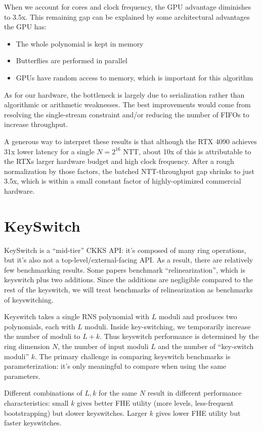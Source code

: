\documentclass{article}
\begin{document}
When we account for cores and clock frequency, the GPU advantage diminishes to 3.5x. This remaining gap can be explained by some architectural advantages the GPU has:
\begin{itemize}
	\item The whole polynomial is kept in memory
	\item Butterflies are performed in parallel
	\item GPUs have random access to memory, which is important for this algorithm
\end{itemize}

As for our hardware, the bottleneck is largely due to serialization rather than algorithmic or arithmetic weaknesses. The best improvements would come from resolving the single-stream constraint and/or reducing the number of FIFOs to increase throughput.

A generous way to interpret these results is that although the RTX 4090 achieves 31x lower latency for a single $N=2^{16}$ NTT, about 10x of this is attributable to the RTXs larger hardware budget and high clock frequency. After a rough normalization by those factors, the batched NTT-throughput gap shrinks to just 3.5x, which is within a small constant factor of highly-optimized commercial hardware.
	
	\section{KeySwitch}
	KeySwitch is a ``mid-tier'' CKKS API: it's composed of many ring operations, but it's also not a top-level/external-facing API. As a result, there are relatively few benchmarking results. Some papers benchmark ``relinearization'', which is keyswitch plus two additions. Since the additions are negligible compared to the rest of the keyswitch, we will treat benchmarks of relinearization as benchmarks of keyswitching. 
	
	Keyswitch takes a single RNS polynomial with $L$ moduli and produces two polynomials, each with $L$ moduli. Inside key-switching, we temporarily increase the number of moduli to $L+k$. Thus keyswitch performance is determined by the ring dimension $N$, the number of input moduli $L$ and the number of ``key-switch moduli'' $k$. The primary challenge in comparing keyswitch benchmarks is parameterization: it's only meaningful to compare when using the same parameters.
	
	Different combinations of $L, k$ for the same $N$ result in different performance characteristics: small $k$ gives better FHE utility (more levels, less-frequent bootstrapping) but slower keyswitches. Larger $k$ gives lower FHE utility but faster keyswitches.
	
\end{document}
